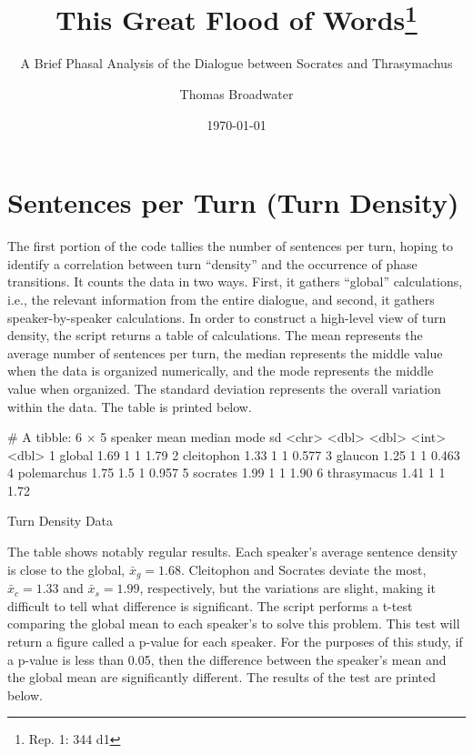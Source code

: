 \documentclass[noraggedright]{turabian-researchpaper}
\title{This Great Flood of Words\thanks{Rep. 1: 344 d1}}
\subtitle{A Brief Phasal Analysis of the Dialogue
  between Socrates and Thrasymachus}
\author{Thomas Broadwater}
\date{\today}
\begin{document}






\maketitle


%

\section{Sentences per Turn (Turn Density)}



The first portion of the code tallies the number of sentences per turn, hoping
to identify a correlation between turn ``density'' and the occurrence of phase
transitions. It counts the data in two ways. First, it gathers ``global''
calculations, i.e., the relevant information from the entire dialogue, and
second, it gathers speaker-by-speaker calculations. In order to construct a
high-level view of turn density, the script returns a table of calculations.
The mean represents the average number of sentences per turn, the median
represents the middle value when the data is organized numerically, and the mode
represents the middle value when organized. The standard deviation represents
the overall variation within the data. The table is printed below.

\begin{table}
\begin{Schunk}
\begin{Soutput}
# A tibble: 6 × 5
  speaker      mean median  mode    sd
  <chr>       <dbl>  <dbl> <int> <dbl>
1 global       1.69    1       1 1.79 
2 cleitophon   1.33    1       1 0.577
3 glaucon      1.25    1       1 0.463
4 polemarchus  1.75    1.5     1 0.957
5 socrates     1.99    1       1 1.90 
6 thrasymacus  1.41    1       1 1.72 
\end{Soutput}
\end{Schunk}
\caption{Turn Density Data}
\label{tab:DensityData}
\end{table}

The table shows notably regular results. Each speaker's average sentence
density is close to the global, $\bar{x}_g = 1.68$. Cleitophon and Socrates
deviate the most, $\bar{x}_c = 1.33$ and $\bar{x}_s = 1.99$, respectively, but
the variations are slight, making it difficult to tell what difference is
significant. The script performs a t-test comparing the global mean to each
speaker's to solve this problem. This test will return a figure called a
p-value for each speaker. For the purposes of this study, if a p-value is less
than 0.05, then the difference between the speaker's mean and the global mean
are significantly different. The results of the test are printed below.
\end{document}
